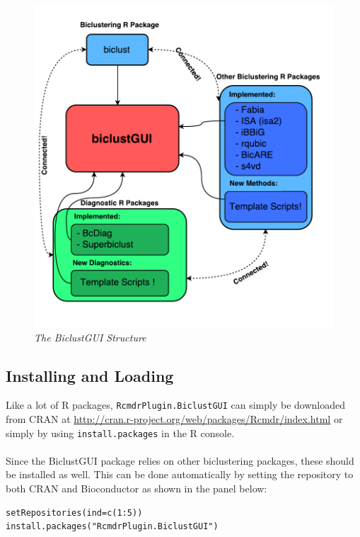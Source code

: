\documentclass[a4paper]{article}\usepackage[]{graphicx}\usepackage[]{color}
\begin{document}
\begin{figure}[H]
\centering
\includegraphics[scale=0.9]{figures/biclustGUI_diagram.pdf}
\caption{{\it The BiclustGUI Structure }\label{biclustGUI_struc}}
\end{figure}

\subsection{Installing and Loading}
\noindent Like a lot of R packages, \texttt{RcmdrPlugin.BiclustGUI} can simply be downloaded
from CRAN at \url{http://cran.r-project.org/web/packages/Rcmdr/index.html} or
simply by using \verb|install.packages| in the R console. \\ \\
Since the BiclustGUI package relies on other biclustering packages, these
should be installed as well. This can be done automatically by setting the
repository to both CRAN and Bioconductor as shown in the panel below:
\begin{verbatim}
setRepositories(ind=c(1:5))
install.packages("RcmdrPlugin.BiclustGUI")
\end{verbatim}
\end{document}
